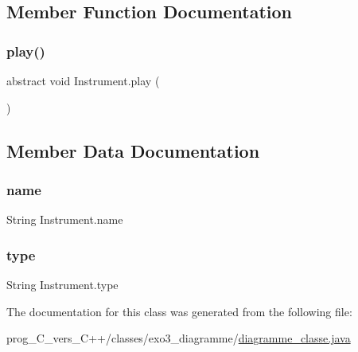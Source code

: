 \subsection{Member Function Documentation}
\mbox{\label{classInstrument_a0ef204f0b4b5f213e395d363ffcfe153}} 
\subsubsection{\texorpdfstring{play()}{play()}}
{\footnotesize\ttfamily abstract void Instrument.\+play (\begin{DoxyParamCaption}{ }\end{DoxyParamCaption})\hspace{0.3cm}{\ttfamily [abstract]}}



\subsection{Member Data Documentation}
\mbox{\label{classInstrument_a5781b39f34c3989aa540a17e26fbd0c8}} 
\subsubsection{\texorpdfstring{name}{name}}
{\footnotesize\ttfamily String Instrument.\+name\hspace{0.3cm}{\ttfamily [protected]}}

\mbox{\label{classInstrument_a90bd9d446bbc526921ed35c654cb5a35}} 
\subsubsection{\texorpdfstring{type}{type}}
{\footnotesize\ttfamily String Instrument.\+type\hspace{0.3cm}{\ttfamily [protected]}}



The documentation for this class was generated from the following file\+:\begin{DoxyCompactItemize}
\item 
prog\+\_\+\+C\+\_\+vers\+\_\+\+C++/classes/exo3\+\_\+diagramme/\hyperlink{diagramme__classe_8java}{diagramme\+\_\+classe.\+java}\end{DoxyCompactItemize}
